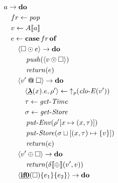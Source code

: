 \begin{figure}
\begin{align*}
&\hspace{3em} a  \rightarrow   \ttbfop{do}  \\
&\hspace{4em} fr  \leftarrow   \itop{pop}  \\
&\hspace{4em} v  \leftarrow  A \llbracket a \rrbracket  \\
&\hspace{4em} e  \leftarrow   \ttbfop{case}  fr  \ttbfop{of}  \\
&\hspace{5em}  \langle  \square   \odot  e \rangle   \rightarrow   \ttbfop{do}  \\
&\hspace{6em}  \itop{push}(  \langle v  \odot   \square  \rangle ) \\
&\hspace{6em}  \itop{return}( e) \\
&\hspace{5em}  \langle v'  \keywordop{ \mathbin{\bm{@}} }   \square  \rangle   \rightarrow   \ttbfop{do}  \\
&\hspace{6em}  \langle  \keyword{\lambda} (x).e, \rho ' \rangle   \leftarrow   \itop{\uparrow_p}  (\itop{clo-E}( v')) \\
&\hspace{6em}  \tau   \leftarrow   \itop{get-Time}  \\
&\hspace{6em}  \sigma   \leftarrow   \itop{get-Store}  \\
&\hspace{6em}  \itop{put-Env}(  \rho ' \lbrack x  \mapsto  (x, \tau ) \rbrack ) \\
&\hspace{6em}  \itop{put-Store}(  \sigma   \sqcup   \lbrack (x, \tau )  \mapsto   \{ v \}  \rbrack ) \\
&\hspace{6em}  \itop{return}( e) \\
&\hspace{5em}  \langle v'  \oplus   \square  \rangle   \rightarrow   \ttbfop{do}  \\
&\hspace{6em}  \itop{return}(  \delta  \llbracket  \oplus  \rrbracket (v',v)) \\
&\hspace{5em}  \langle  \keyword{if0} ( \square ) \{ e _1  \}  \{ e _2  \}  \rangle   \rightarrow   \ttbfop{do}  \\

\end{align*}
\end{figure}

